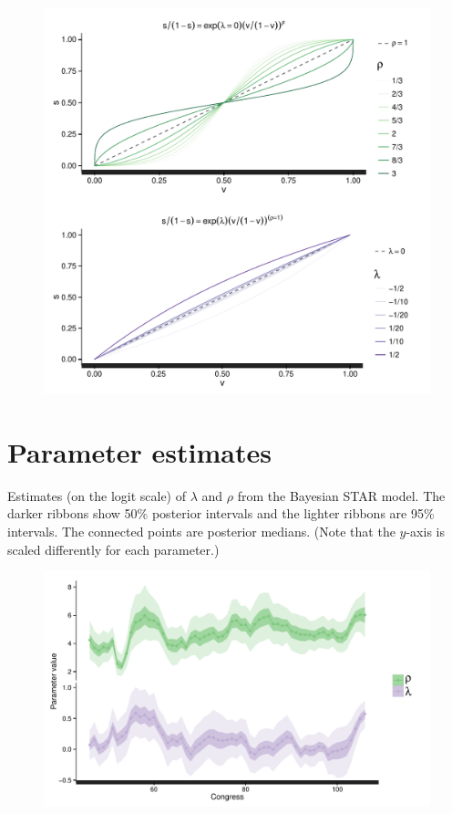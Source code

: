 \begin{figure}[h]
\centering
	\includegraphics[scale=0.8]{sections/figs/seats_votes}
\label{fig:seats_votes}
\end{figure}


\clearpage
\section[Parameter estimates]{Parameter estimates}\label{AppendixC}

Estimates (on the logit scale) of $\lambda$ and $\rho$ from the Bayesian STAR model. 
The darker ribbons show 50\% posterior intervals and the lighter ribbons are 95\% intervals. 
The connected points are posterior medians. 
(Note that the $y$-axis is scaled differently for each parameter.) 

\vspace{.5cm}

\begin{figure}[h]
\centering
	\includegraphics[scale=0.8]{sections/figs/lambda_rho}
\label{fig:lambda_rho}
\end{figure}


